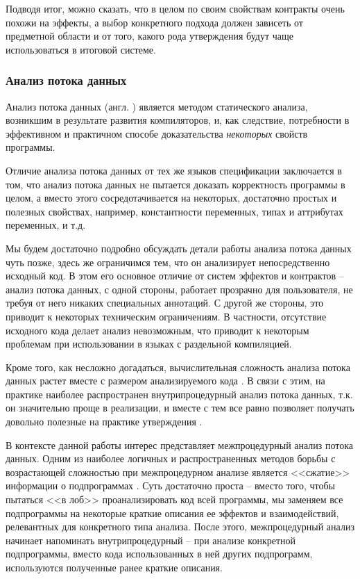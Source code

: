 Подводя итог, можно сказать, что в целом по своим свойствам контракты очень похожи на эффекты, а выбор конкретного подхода должен зависеть от предметной области и от того, какого рода утверждения будут чаще использоваться в итоговой системе.






\subsubsection{Анализ потока данных}

Анализ потока данных (англ. ) является методом статического анализа, возникшим в результате развития компиляторов, и, как следствие, потребности в эффективном и практичном способе доказательства \emph{некоторых} свойств программы.

Отличие анализа потока данных от тех же языков спецификации заключается в том, что анализ потока данных не пытается доказать корректность программы в целом, а вместо этого сосредотачивается на некоторых, достаточно простых и полезных свойствах, например, константности переменных, типах и аттрибутах переменных, и т.д. \cite{Sharir78}

Мы будем достаточно подробно обсуждать детали работы анализа потока данных чуть позже, здесь же ограничимся тем, что он анализирует непосредственно исходный код. В этом его основное отличие от систем эффектов и контрактов -- анализ потока данных, с одной стороны, работает прозрачно для пользователя, не требуя от него никаких специальных аннотаций. С другой же стороны, это приводит к некоторых техническим ограничениям. В частности, отсутствие исходного кода делает анализ невозможным, что приводит к некоторым проблемам при использовании в языках с раздельной компиляцией.

Кроме того, как несложно догадаться, вычислительная сложность анализа потока данных растет вместе с размером анализируемого кода \cite{Sagiv96}. В связи с этим, на практике наиболее распространен внутрипроцедурный анализ потока данных, т.к. он значительно проще в реализации, и вместе с тем все равно позволяет получать довольно полезные на практике утверждения \cite{dragon-book}.

В контексте данной работы интерес представляет межпроцедурный анализ потока данных. Одним из наиболее логичных и распространенных методов борьбы с возрастающей сложностью при межпроцедурном анализе является <<сжатие>> информации о подпрограммах \cite{Weihl80, Barth78}. Суть достаточно проста -- вместо того, чтобы пытаться <<в лоб>> проанализировать код всей программы, мы заменяем все подпрограммы на некоторые краткие описания ее эффектов и взаимодействий, релевантных для конкретного типа анализа. После этого, межпроцедурный анализ начинает напоминать внутрипроцедурный -- при анализе конкретной подпрограммы, вместо кода использованных в ней других подпрограмм, используются полученные ранее краткие описания.

